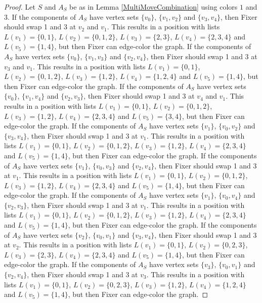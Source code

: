 \documentclass[12pt]{amsart}
\theoremstyle{plain}
\theoremstyle{definition}
\theoremstyle{remark}
\begin{document}
\begin{proof}
Let $S$ and $A_S$ be as in Lemma \ref{MultiMoveCombination} using colors $1$ and $3$. If the components of $A_S$ have vertex sets $\{v_0\}$, $\{v_1, v_2\}$ and $\{v_3, v_4\}$, then Fixer should swap 1 and 3 at $v_2$ and $v_1$. This results in a position with lists $L(v_1) = \{0, 1\}$, $L(v_2) = \{0, 1, 2\}$, $L(v_3) = \{2, 3\}$, $L(v_4) = \{2, 3, 4\}$ and $L(v_5) = \{1, 4\}$, but then Fixer can edge-color the graph.
If the components of $A_S$ have vertex sets $\{v_0\}$, $\{v_1, v_3\}$ and $\{v_2, v_4\}$, then Fixer should swap 1 and 3 at $v_3$ and $v_1$. This results in a position with lists $L(v_1) = \{0, 1\}$, $L(v_2) = \{0, 1, 2\}$, $L(v_3) = \{1, 2\}$, $L(v_4) = \{1, 2, 4\}$ and $L(v_5) = \{1, 4\}$, but then Fixer can edge-color the graph.
If the components of $A_S$ have vertex sets $\{v_0\}$, $\{v_1, v_4\}$ and $\{v_2, v_3\}$, then Fixer should swap 1 and 3 at $v_4$ and $v_1$. This results in a position with lists $L(v_1) = \{0, 1\}$, $L(v_2) = \{0, 1, 2\}$, $L(v_3) = \{1, 2\}$, $L(v_4) = \{2, 3, 4\}$ and $L(v_5) = \{3, 4\}$, but then Fixer can edge-color the graph.
If the components of $A_S$ have vertex sets $\{v_1\}$, $\{v_0, v_2\}$ and $\{v_3, v_4\}$, then Fixer should swap 1 and 3 at $v_1$. This results in a position with lists $L(v_1) = \{0, 1\}$, $L(v_2) = \{0, 1, 2\}$, $L(v_3) = \{1, 2\}$, $L(v_4) = \{2, 3, 4\}$ and $L(v_5) = \{1, 4\}$, but then Fixer can edge-color the graph.
If the components of $A_S$ have vertex sets $\{v_1\}$, $\{v_0, v_3\}$ and $\{v_2, v_4\}$, then Fixer should swap 1 and 3 at $v_1$. This results in a position with lists $L(v_1) = \{0, 1\}$, $L(v_2) = \{0, 1, 2\}$, $L(v_3) = \{1, 2\}$, $L(v_4) = \{2, 3, 4\}$ and $L(v_5) = \{1, 4\}$, but then Fixer can edge-color the graph.
If the components of $A_S$ have vertex sets $\{v_1\}$, $\{v_0, v_4\}$ and $\{v_2, v_3\}$, then Fixer should swap 1 and 3 at $v_1$. This results in a position with lists $L(v_1) = \{0, 1\}$, $L(v_2) = \{0, 1, 2\}$, $L(v_3) = \{1, 2\}$, $L(v_4) = \{2, 3, 4\}$ and $L(v_5) = \{1, 4\}$, but then Fixer can edge-color the graph.
If the components of $A_S$ have vertex sets $\{v_2\}$, $\{v_0, v_1\}$ and $\{v_3, v_4\}$, then Fixer should swap 1 and 3 at $v_2$. This results in a position with lists $L(v_1) = \{0, 1\}$, $L(v_2) = \{0, 2, 3\}$, $L(v_3) = \{2, 3\}$, $L(v_4) = \{2, 3, 4\}$ and $L(v_5) = \{1, 4\}$, but then Fixer can edge-color the graph.
If the components of $A_S$ have vertex sets $\{v_3\}$, $\{v_0, v_1\}$ and $\{v_2, v_4\}$, then Fixer should swap 1 and 3 at $v_3$. This results in a position with lists $L(v_1) = \{0, 1\}$, $L(v_2) = \{0, 2, 3\}$, $L(v_3) = \{1, 2\}$, $L(v_4) = \{1, 2, 4\}$ and $L(v_5) = \{1, 4\}$, but then Fixer can edge-color the graph.

\end{proof}
\end{document}
